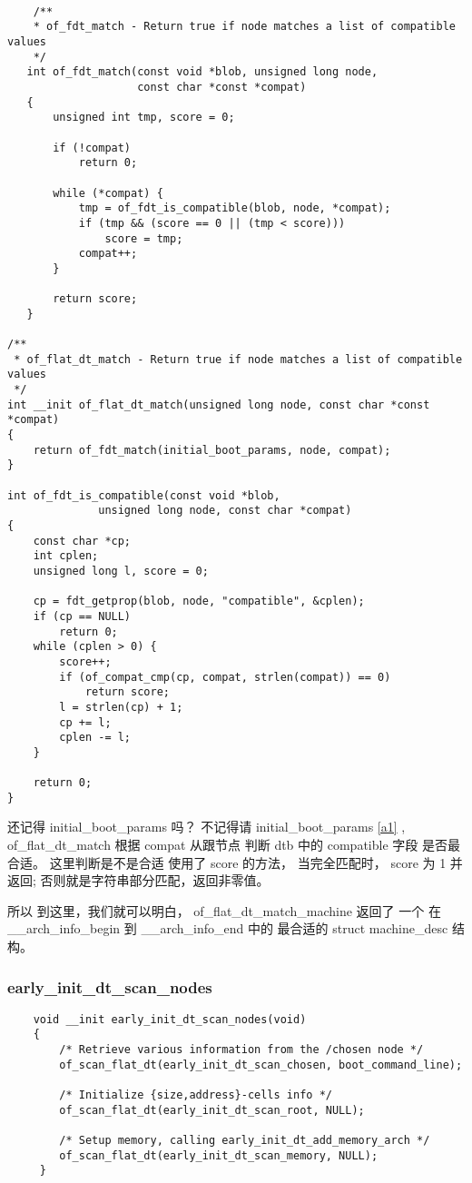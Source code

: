 \begin{lstlisting}

    /**
    * of_fdt_match - Return true if node matches a list of compatible values
    */
   int of_fdt_match(const void *blob, unsigned long node,
                    const char *const *compat)
   {
       unsigned int tmp, score = 0;
   
       if (!compat)
           return 0;
   
       while (*compat) {
           tmp = of_fdt_is_compatible(blob, node, *compat);
           if (tmp && (score == 0 || (tmp < score)))
               score = tmp;
           compat++;
       }
   
       return score;
   }

/**
 * of_flat_dt_match - Return true if node matches a list of compatible values
 */
int __init of_flat_dt_match(unsigned long node, const char *const *compat)
{
	return of_fdt_match(initial_boot_params, node, compat);
}

int of_fdt_is_compatible(const void *blob,
		      unsigned long node, const char *compat)
{
	const char *cp;
	int cplen;
	unsigned long l, score = 0;

	cp = fdt_getprop(blob, node, "compatible", &cplen);
	if (cp == NULL)
		return 0;
	while (cplen > 0) {
		score++;
		if (of_compat_cmp(cp, compat, strlen(compat)) == 0)
			return score;
		l = strlen(cp) + 1;
		cp += l;
		cplen -= l;
	}

	return 0;
}

\end{lstlisting}

还记得 initial\_boot\_params 吗？ 不记得请 initial\_boot\_params \ref{a1}  , of\_flat\_dt\_match 根据 compat 从跟节点 
判断 dtb 中的 compatible 字段 是否最合适。 这里判断是不是合适 使用了 score 的方法， 当完全匹配时，
score 为 1  并返回; 否则就是字符串部分匹配，返回非零值。 


所以 到这里，我们就可以明白， of\_flat\_dt\_match\_machine  返回了 一个 在  \_\_arch\_info\_begin 到 \_\_arch\_info\_end  中的 最合适的 struct machine\_desc
结构。 


\subsubsection{early\_init\_dt\_scan\_nodes}

\begin{lstlisting}
    void __init early_init_dt_scan_nodes(void)
    {
        /* Retrieve various information from the /chosen node */
        of_scan_flat_dt(early_init_dt_scan_chosen, boot_command_line);
    
        /* Initialize {size,address}-cells info */
        of_scan_flat_dt(early_init_dt_scan_root, NULL);
    
        /* Setup memory, calling early_init_dt_add_memory_arch */
        of_scan_flat_dt(early_init_dt_scan_memory, NULL);
     }    
\end{lstlisting}



